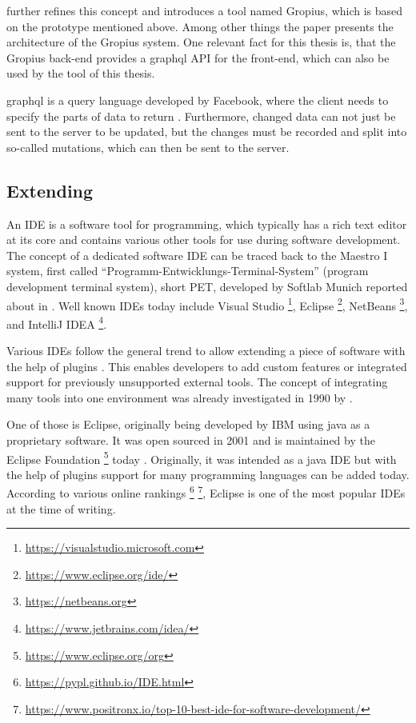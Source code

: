 \cite{speth2020gropius} further refines this concept and introduces a tool named \gls{Gropius}, which is  based on the prototype mentioned above.
Among other things the paper presents the architecture of the \gls{Gropius} system. 
One relevant fact for this thesis is, that the \gls{Gropius} back-end provides a \gls{graphql} \gls{API} for the front-end,
which can also be used by the tool of this thesis.

\gls{graphql} is a query language developed by Facebook, where the client needs to specify the parts of data to return \cite{grpahql2018}.
Furthermore, changed data can not just be sent to the server to be updated, but the changes must be recorded and split into so-called mutations,
which can then be sent to the server.

\subsection{Extending }
\label{ssec:ch2:ss1.3}
An \gls{IDE} is a software tool for programming, which typically has a rich text editor at its core 
and contains various other tools for use during software development.
The concept of a dedicated software \gls{IDE} can be traced back to the Maestro I system, first called ``Programm-Entwicklungs-Terminal-System'' (program development terminal system), short PET, developed by Softlab Munich reported about in \cite{Computerwoche1975Ide}.
Well known \glspl{IDE} today include Visual Studio \footnote{\url{https://visualstudio.microsoft.com}}, \gls{Eclipse} \footnote{\url{https://www.eclipse.org/ide/}}, NetBeans \footnote{\url{https://netbeans.org}}, and IntelliJ IDEA \footnote{\url{https://www.jetbrains.com/idea/}}.

Various \glspl{IDE} follow the general trend to allow extending a piece of software with the help of plugins \cite{chang2008issues}.
This enables developers to add custom features or integrated support for previously unsupported external tools.
The concept of integrating many tools into one environment was already investigated in 1990 by \cite{wasserman1990tool}.

One of those is \gls{Eclipse}, originally being developed by IBM using \gls{java} as a proprietary software.
It was open sourced in 2001 and is maintained by the Eclipse Foundation 
\footnote{\url{https://www.eclipse.org/org}} today \cite{burnette2005eclipse}.
Originally, it was intended as a \gls{java} \gls{IDE} but with the help of plugins support for many programming languages can be added today.
According to various online rankings \footnote{\url{https://pypl.github.io/IDE.html}}
\footnote{\url{https://www.positronx.io/top-10-best-ide-for-software-development/}},
\gls{Eclipse} is one of the most popular \glspl{IDE} at the time of writing.

